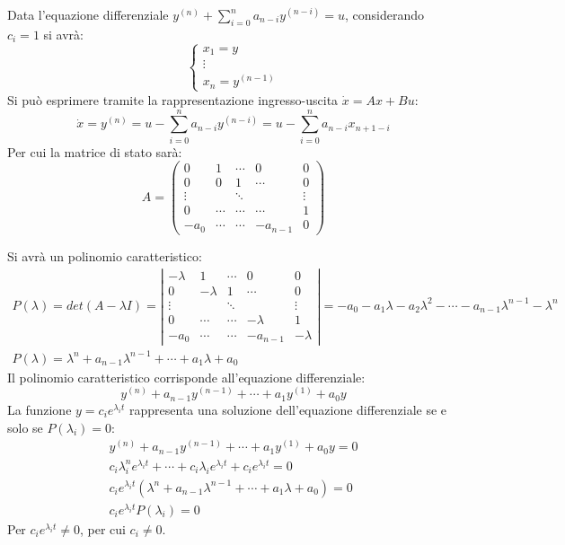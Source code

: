 \documentclass{article}
\numberwithin{equation}{subsection}
\begin{document}
Data l'equazione differenziale $y^{(n)}+\displaystyle\sum_{i=0}^{n}a_{n-i}y^{(n-i)}=u$, considerando $c_i=1$ si avrà:
\begin{equation}
    \begin{cases}
        x_1=y\\
        \vdots\\
        x_n=y^{(n-1)}
    \end{cases}
\end{equation}
Si può esprimere tramite la rappresentazione ingresso-uscita $\dot x=Ax+Bu$: 
\begin{equation}
    \dot x=y^{(n)}=u-\displaystyle\sum_{i=0}^{n}a_{n-i}y^{(n-i)}=u-\sum_{i=0}^{n}a_{n-i}x_{n+1-i}
\end{equation}
Per cui la matrice di stato sarà:
\begin{equation}
    A=
    \begin{pmatrix}
        0 & 1 & \cdots & 0 & 0\\
        0 & 0 & 1 & \cdots & 0\\
        \vdots & & \ddots & & \vdots\\
        0 & \cdots & \cdots & \cdots & 1\\
        -a_0 & \cdots & \cdots & -a_{n-1} & 0
    \end{pmatrix}
\end{equation}

Si avrà un polinomio caratteristico: 
\begin{gather}
    P(\lambda)=det(A-\lambda I)=
    \left|\begin{matrix}
        -\lambda & 1 & \cdots & 0 & 0\\
        0 & -\lambda & 1 & \cdots & 0\\
        \vdots & & \ddots & & \vdots\\
        0 & \cdots & \cdots & -\lambda & 1\\
        -a_0 & \cdots & \cdots & -a_{n-1} & -\lambda
    \end{matrix}\right|=
    -a_0-a_1\lambda-a_2\lambda^2-\cdots-a_{n-1}\lambda^{n-1}-\lambda^n\\
    P(\lambda)=\lambda^n+a_{n-1}\lambda^{n-1}+\cdots+a_1\lambda+a_0
\end{gather}
Il polinomio caratteristico corrisponde all'equazione differenziale:
\begin{equation}
    y^{(n)}+a_{n-1}y^{(n-1)}+\cdots+a_1y^{(1)}+a_0y
\end{equation}
La funzione $y=c_ie^{\lambda_it}$ rappresenta una soluzione dell'equazione differenziale se e solo se $P(\lambda_i)=0$:
\begin{gather}
    y^{(n)}+a_{n-1}y^{(n-1)}+\cdots+a_1y^{(1)}+a_0y=0\\
    c_i\lambda_i^ne^{\lambda_it}+\cdots+c_i\lambda_ie^{\lambda_it}+c_ie^{\lambda_it}=0\\
    c_ie^{\lambda_it}(\lambda^n+a_{n-1}\lambda^{n-1}+\cdots+a_1\lambda+a_0)=0\\
    c_ie^{\lambda_it}P(\lambda_i)=0
\end{gather}
Per $c_ie^{\lambda_it}\neq0$, per cui $c_i\neq0$. 
\end{document}
